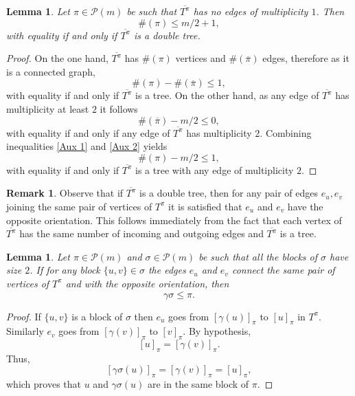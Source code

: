 \documentclass{article}
\newtheorem{lemma}      [theorem]{Lemma}
\theoremstyle{definition}
\newtheorem{remark}     [theorem]{Remark}
\newcommand{\cP}{\mathcal{P}}
\begin{document}
{\begin{lemma}\label{Lemma: First characterization of pi}
Let $\pi\in \cP(m)$ be such that $\overline{T^\pi}$ has no edges of multiplicity $1$. Then
$$\#(\pi)\leq m/2+1,$$
with equality if and only if $\overline{T^\pi}$ is a double tree.
\end{lemma}
\begin{proof}
On the one hand, $\overline{T^\pi}$ has $\#(\pi)$ vertices and $\#(\overline{\pi})$ edges, therefore as it is a connected graph,
\begin{equation}\label{Aux 1}
\#(\pi)-\#(\overline{\pi})\leq 1,
\end{equation}
with equality if and only if $\overline{T^\pi}$ is a tree. On the other hand, as any edge of $\overline{T^\pi}$ has multiplicity at least $2$ it follows
\begin{equation}\label{Aux 2}
\#(\overline{\pi})-m/2\leq 0,
\end{equation}
with equality if and only if any edge of $\overline{T^\pi}$ has multiplicity $2$. Combining inequalities \ref{Aux 1} and \ref{Aux 2} yields
$$\#(\pi)-m/2\leq 1,$$
with equality if and only if $\overline{T^\pi}$ is a tree with any edge of multiplicity $2$.
\end{proof}

\begin{remark}\label{Remark: Properties of double tree}
Observe that if $\overline{T^\pi}$ is a double tree, then for any pair of edges $e_u,e_v$ joining the same pair of vertices of $T^\pi$ it is satisfied that $e_u$ and $e_v$ have the opposite orientation. This follows immediately from the fact that each vertex of $\overline{T^\pi}$ has the same number of incoming and outgoing edges and $\overline{T^\pi}$ is a tree.
\end{remark}

\begin{lemma}\label{Lemma: Gamma sigma overline less or equal than pi}
Let $\pi\in \cP(m)$ and $\sigma\in \cP(m)$ be such that all the blocks of $\sigma$ have size $2$. If for any block $\{u,v\}\in \sigma$ the edges $e_u$ and $e_v$ connect the same pair of vertices of $T^{\pi}$ and with the opposite orientation, then
$$\gamma\sigma \leq \pi.$$
\end{lemma}
\begin{proof}
If $\{u,v\}$ is a block of $\sigma$ then $e_u$ goes from $[\gamma(u)]_{\pi}$ to $[u]_{\pi}$ in $T^{\pi}$. Similarly $e_v$ goes from $[\gamma(v)]_{\pi}$ to $[v]_{\pi}$. By hypothesis,
$$[u]_{\pi}=[\gamma(v)]_{\pi}.$$
Thus,
$$[\gamma\sigma(u)]_{\pi}=[\gamma(v)]_{\pi}=[u]_{\pi},$$
which proves that $u$ and $\gamma\sigma(u)$ are in the same block of $\pi$.
\end{proof}

}
\end{document}
